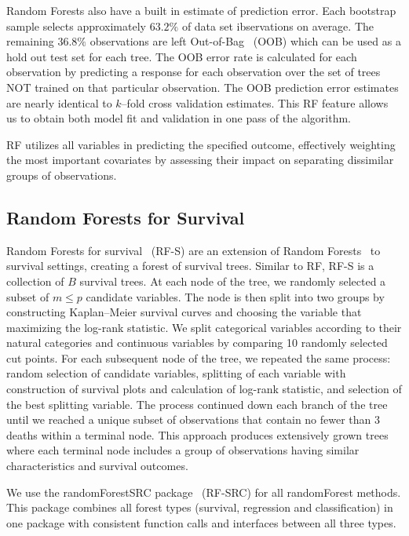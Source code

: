 \documentclass[nojss]{jss}\usepackage[]{graphicx}\usepackage[]{color}
\begin{document}
Random Forests also have a built in estimate of prediction error. Each bootstrap sample selects approximately $63.2\%$ of data set ibservations on average. The remaining $36.8\%$ observations are left Out-of-Bag~\citep{BreimanOOB:1996e} (OOB) which can be used as a hold out test set for each tree. The OOB error rate is calculated for each observation by predicting a response for each observation over the set of trees NOT trained on that particular observation. The OOB prediction error estimates are nearly identical to $k$--fold cross validation estimates. This RF feature allows us to obtain both model fit and validation in one pass of the algorithm.

RF utilizes all variables in predicting the specified outcome, effectively weighting the most important covariates by assessing their impact on separating dissimilar groups of observations. 

\subsection{Random Forests for Survival}\label{S:rfs}
Random Forests for survival~\citep{Ishwaran:2007,Ishwaran:2008} (RF-S) are an extension of Random Forests~\citep{Breiman:2001} to survival settings, creating a forest of survival trees. Similar to RF, RF-S is a collection of $B$ survival trees. At each node of the tree, we randomly selected a subset of $m \le p$ candidate variables. The node is then split into two groups by constructing Kaplan--Meier survival curves and choosing the variable that maximizing the log-rank statistic. We split categorical variables according to their natural categories and continuous variables by comparing 10 randomly selected cut points. For each subsequent node of the tree, we repeated the same process: random selection of candidate variables, splitting of each variable with construction of survival plots and calculation of log-rank statistic, and selection of the best splitting variable. The process continued down each branch of the tree until we reached a unique subset of observations that contain no fewer than 3 deaths within a terminal node. This approach produces extensively grown trees where each terminal node includes a group of observations having similar characteristics and survival outcomes.

We use the randomForestSRC package~\citep{IshwaranRFSRC:2014} (RF-SRC) for all randomForest methods. This package combines all forest types (survival, regression and classification) in one package with consistent function calls and interfaces between all three types. 
\end{document}
